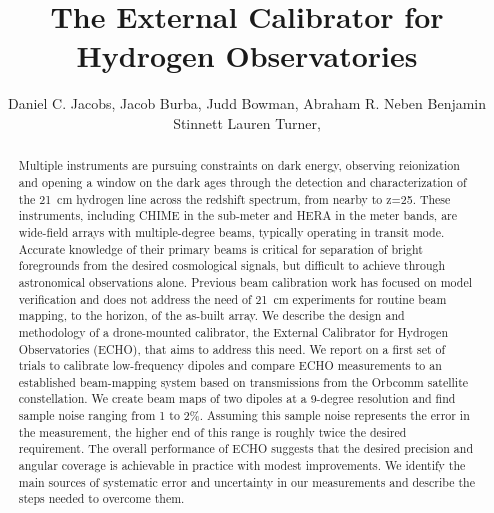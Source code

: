 \documentclass[preprint2,numberedappendix,tighten,twocolappendix]{aastex6}
\begin{document}
\title{The External Calibrator for Hydrogen Observatories}



\author{
Daniel C. Jacobs,
Jacob Burba,
Judd Bowman,
Abraham R. Neben
Benjamin Stinnett
Lauren Turner,
}



\begin{abstract}
Multiple instruments are pursuing constraints on dark energy, observing reionization and opening a window on the dark ages through the detection and characterization of the 21~cm hydrogen line across the redshift spectrum, from nearby to z=25.  These instruments, including CHIME in the sub-meter and HERA in the meter bands, are wide-field arrays with multiple-degree beams, typically operating in transit mode.  Accurate knowledge of their primary beams is critical for separation of bright foregrounds from the desired cosmological signals, but difficult to achieve through astronomical observations alone.  Previous beam calibration work has focused on model verification and does not address the need of 21~cm experiments for routine beam mapping, to the horizon, of the as-built array.  We describe the design and methodology of a drone-mounted calibrator, the External Calibrator for Hydrogen Observatories (ECHO), that aims to address this need. We report on a first set of trials to calibrate low-frequency dipoles and compare ECHO measurements to an established beam-mapping system based on transmissions from the Orbcomm satellite constellation.  We create beam maps of two dipoles at a  9-degree resolution and find sample noise ranging from 1 to  2\%.  Assuming this sample noise represents the error in the measurement, the higher end of this range is roughly twice the desired requirement.  The overall performance of ECHO suggests that the desired precision and angular coverage is achievable in practice with modest improvements. We identify the main sources of systematic error and uncertainty in our measurements and describe the steps needed to overcome them.
\end{abstract}
\end{document}
